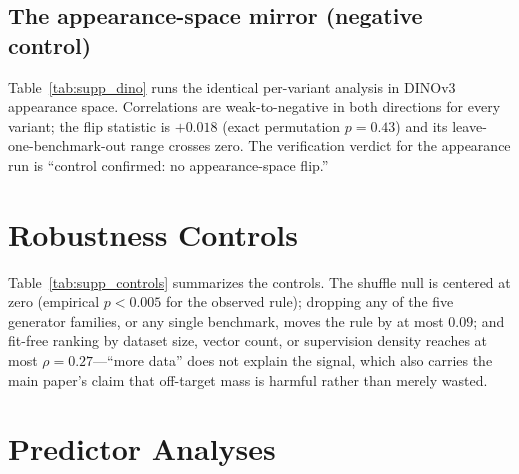 \documentclass[runningheads]{llncs}
\begin{document}
\begin{table}[h]
\centering
\caption{$\epsilon$-radius coverage replication of the rule (per variant,
regime-grouped).}
\label{tab:supp_eps}
\scriptsize
\setlength{\tabcolsep}{3pt}

\end{table}

\subsection{The appearance-space mirror (negative control)}
Table~\ref{tab:supp_dino} runs the identical per-variant analysis in DINOv3
appearance space. Correlations are weak-to-negative in both directions for
every variant; the flip statistic is $+0.018$ (exact permutation $p{=}0.43$)
and its leave-one-benchmark-out range crosses zero. The verification verdict
for the appearance run is ``control confirmed: no appearance-space flip.''

\begin{table}[h]
\centering
\caption{The same analysis as main-paper Table~1, in appearance (DINO) space.
No direction carries signal and no flip exists.}
\label{tab:supp_dino}
\scriptsize

\end{table}

\section{Robustness Controls}
\label{supp:robust}

Table~\ref{tab:supp_controls} summarizes the controls. The shuffle null is
centered at zero (empirical $p{<}0.005$ for the observed rule); dropping any
of the five generator families, or any single benchmark, moves the rule by at
most $0.09$; and fit-free ranking by dataset size, vector count, or
supervision density reaches at most $\rho{=}0.27$---``more data'' does not
explain the signal, which also carries the main paper's claim that off-target
mass is harmful rather than merely wasted.

\begin{table}[h]
\centering
\caption{Robustness controls for the fit-free rule.}
\label{tab:supp_controls}
\small

\end{table}

\section{Predictor Analyses}
\label{supp:predict}
\end{document}
